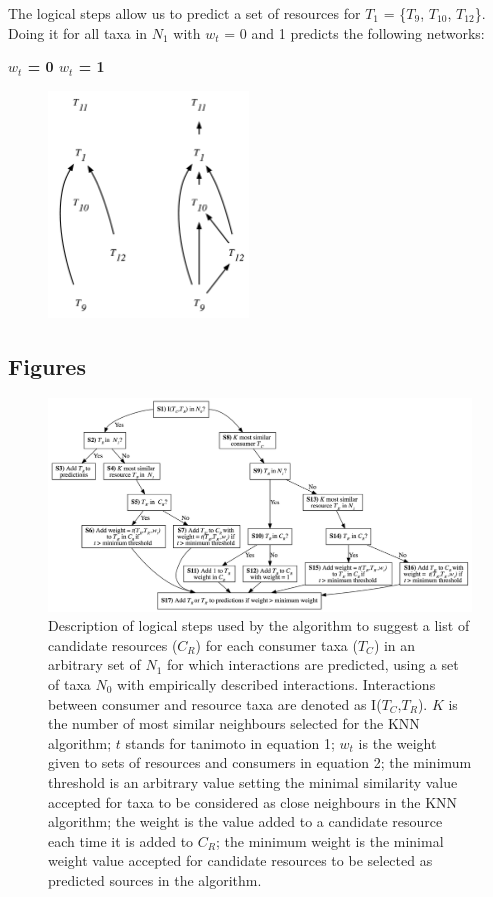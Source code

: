 \documentclass[letterpaper]{article}
\begin{document}
The logical steps allow us to predict a set of resources for $T_1$ = \{$T_9$, $T_{10}$, $T_{12}$\}. Doing it for all taxa in $N_1$ with $w_t$ = 0 and 1 predicts the following networks:
\bigskip

\centerline{\textbf{$w_t$ = 0 \quad \quad \quad \quad \quad $w_t$ = 1} \quad}
    \begin{figure}[h!]
    \centering\includegraphics[height = 6cm]{example.png}
    \end{figure}

\newpage
\subsection{Figures}
    \begin{figure}[h]
      \centering\includegraphics[width=\textwidth]{Decision_Diagram.png}
      \caption{Description of logical steps used by the algorithm to suggest a list of candidate resources ($C_R$) for each consumer taxa ($T_C$) in an arbitrary set of $N_1$ for which interactions are predicted, using a set of taxa $N_0$ with empirically described interactions. Interactions between consumer and resource taxa are denoted as I($T_C$,$T_R$). $K$ is the number of most similar neighbours selected for the KNN algorithm; $t$ stands for tanimoto in equation 1; $w_t$ is the weight given to sets of resources and consumers in equation 2; the minimum threshold is an arbitrary value setting the minimal similarity value accepted for taxa to be considered as close neighbours in the KNN algorithm; the weight is the value added to a candidate resource each time it is added to $C_R$; the minimum weight is the minimal weight value accepted for candidate resources to be selected as predicted sources in the algorithm.}
      \label{fig:decision_diag}
\end{figure}
\end{document}
